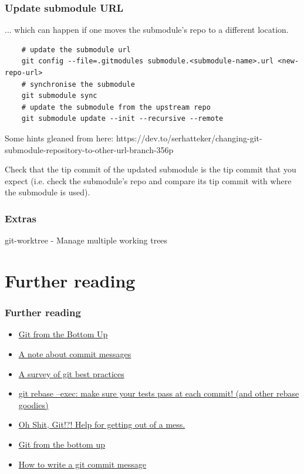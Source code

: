 \documentclass{git_course}
\begin{document}
\begin{frame}[fragile]
    \frametitle{Update submodule URL}

    ... which can happen if one moves the submodule's repo to a different
    location.

    \begin{lstlisting}
    # update the submodule url
    git config --file=.gitmodules submodule.<submodule-name>.url <new-repo-url>
    # synchronise the submodule
    git submodule sync
    # update the submodule from the upstream repo
    git submodule update --init --recursive --remote
    \end{lstlisting}

    Some hints gleaned from here:
    https://dev.to/serhatteker/changing-git-submodule-repository-to-other-url-branch-356p

    Check that the tip commit of the updated submodule is the tip commit
    that you expect (i.e. check the submodule's repo and compare its tip
    commit with where the submodule is used).
\end{frame}

\begin{frame}
\frametitle{Extras}
git-worktree - Manage multiple working trees
\end{frame}

\section{Further reading}

\begin{frame}
\frametitle{Further reading}
\begin{itemize}
    \item \href{http://jwiegley.github.io/git-from-the-bottom-up/}{Git from the Bottom Up}
    \item \href{http://tbaggery.com/2008/04/19/a-note-about-git-commit-messages.html}
               {A note about commit messages}
    \item \href{https://xdg.me/blog/a-survey-of-git-best-practices/}
               {A survey of git best practices}
    \item \href{http://kamalmarhubi.com/blog/2016/03/08/git-rebase-exec-make-sure-your-tests-pass-at-each-commit-and-other-rebase-goodies/}
               {git rebase --exec: make sure your tests pass at each commit!  (and other rebase goodies)}
    \item \href{https://ohshitgit.com/}{Oh Shit, Git!?!  Help for getting out of a mess.}
    \item \href{https://jwiegley.github.io/git-from-the-bottom-up/}{Git from the bottom up}
    \item \href{https://cbea.ms/git-commit/}{How to write a git commit message}
\end{itemize}
\end{frame}
\end{document}

